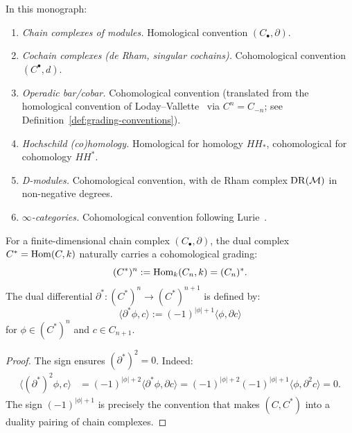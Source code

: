 \begin{convention}
\label{conv:standard-by-context}
In this monograph:
\begin{enumerate}[label=(\roman*)]
\item \emph{Chain complexes of modules.} Homological convention $(C_\bullet, \partial)$.
\item \emph{Cochain complexes (de Rham, singular cochains).}
Cohomological convention $(C^\bullet, d)$.
\item \emph{Operadic bar/cobar.} Cohomological convention (translated from the homological convention of Loday--Vallette~\cite{LV12} via $C^n = C_{-n}$; see Definition~\ref{def:grading-conventions}).
\item \emph{Hochschild (co)homology.} Homological for homology $HH_*$,
cohomological for cohomology $HH^*$.
\item \emph{D-modules.} Cohomological convention, with de Rham complex
$\mathrm{DR}(\mathcal{M})$ in non-negative degrees.
\item \emph{$\infty$-categories.} Cohomological convention following
Lurie~\cite{HTT, HA}.
\end{enumerate}
\end{convention}

\begin{proposition}
\label{prop:duality-grading}
For a finite-dimensional chain complex $(C_\bullet, \partial)$, the dual 
complex $C^* = \operatorname{Hom}(C, k)$ naturally carries a cohomological grading:
\[
(C^*)^n := \operatorname{Hom}_k(C_n, k) = (C_n)^*.
\]
The dual differential $\partial^*: (C^*)^n \to (C^*)^{n+1}$ is defined by:
\[
\langle \partial^* \phi, c \rangle := (-1)^{|\phi|+1} \langle \phi, \partial c \rangle
\]
for $\phi \in (C^*)^n$ and $c \in C_{n+1}$.
\end{proposition}

\begin{proof}
The sign ensures $(\partial^*)^2 = 0$. Indeed:
\begin{align*}
\langle (\partial^*)^2 \phi, c \rangle 
&= (-1)^{|\phi|+2} \langle \partial^* \phi, \partial c \rangle 
= (-1)^{|\phi|+2} (-1)^{|\phi|+1} \langle \phi, \partial^2 c \rangle = 0.
\end{align*}
The sign $(-1)^{|\phi|+1}$ is precisely the convention that makes
$(C, C^*)$ into a duality pairing of chain complexes.
\end{proof}

